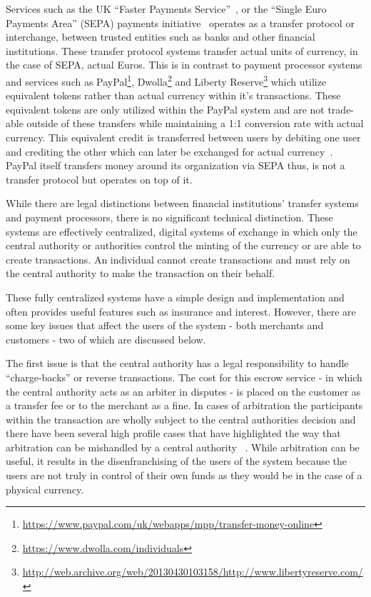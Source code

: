 Services  such as the UK ``Faster Payments  Service''~\cite{guardian-fps}, or the  ``Single Euro Payments Area''  (SEPA) payments initiative~\cite{SEPA}  operates as a transfer protocol or interchange, between trusted  entities such as banks and other financial institutions.  These transfer  protocol systems transfer  actual units of currency, in the case of SEPA, actual Euros.  This is  in contrast to payment processor systems and services such as PayPal\footnote{\url{https://www.paypal.com/uk/webapps/mpp/transfer-money-online}}, Dwolla\footnote{\url{https://www.dwolla.com/individuals}} and Liberty Reserve\footnote{\url{http://web.archive.org/web/20130430103158/http://www.libertyreserve.com/}} which utilize equivalent tokens rather than actual currency within it's transactions.  These equivalent tokens are only utilized within the PayPal system and are not trade-able outside of these transfers while maintaining a 1:1 conversion rate with actual currency. This equivalent credit is transferred between users by debiting one user and crediting the other which can later be exchanged for actual currency~\cite{paypal}.  PayPal itself transfers money around its organization via SEPA thus, is not a transfer protocol but operates on top of it.

While there are legal distinctions between financial institutions' transfer systems and payment processors,  there is no significant technical distinction.  These systems are  effectively centralized, digital systems of exchange in which only the  central authority or authorities control the minting of the currency or  are able to create transactions.  An individual cannot create  transactions and must rely on the central authority to make the  transaction on their behalf.

These  fully centralized systems have a simple design and implementation and often provides useful features such as insurance and interest.  However,  there are some key issues that affect the users of the system -  both  merchants and customers - two of which are discussed  below.

The  first issue is that the central authority has a legal responsibility to  handle ``charge-backs'' or reverse transactions.   The  cost for this escrow service - in which the central authority acts as  an arbiter in  disputes - is placed on the customer as a transfer fee or  to the  merchant as a fine.  In cases of arbitration the participants within the transaction are wholly  subject to the central authorities decision and there have been several  high profile cases that have highlighted the way that arbitration can  be mishandled by a central authority ~\cite{violin}.   While arbitration can be useful, it results in the disenfranchising of  the users of the system because the users are not truly in control of  their own funds as they would be in the case of a physical currency.

